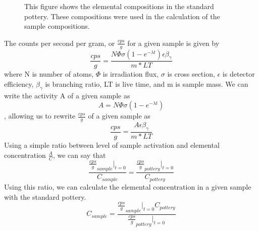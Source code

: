 \documentclass[]{article}
\begin{document}
\begin{figure}[h]
\centering
{}
\caption{This figure shows the elemental compositions in the standard pottery. These compositions were used in the calculation of the sample compositions.}
\end{figure}

The counts per second per gram, or $\frac{cps}{g}$ for a given sample is given by $$\frac{cps}{g} = \frac{N\Phi\sigma(1-e^{-\lambda t})\epsilon \beta_{ \gamma}}{m * LT}$$ where N is number of atoms, $\Phi$ is irradiation flux, $\sigma$ is cross section, $\epsilon$ is detector efficiency, $\beta_{\gamma}$ is branching ratio, LT is live time, and m is sample mass. We can write the activity A of a given sample as $$A=N\Phi\sigma(1-e^{-\lambda t})$$, allowing us to rewrite $\frac{cps}{g}$ of a given sample as $$\frac{cps}{g} = \frac{A\epsilon\beta_{\gamma}}{m*LT}$$ Using a simple ratio between level of sample activation and elemental concentration $\frac{A}{C}$, we can say that $$\frac{\frac{cps}{g}_{sample}|_{t=0}}{C_{sample}} = \frac{\frac{cps}{g}_{pottery}|_{t=0}}{C_{pottery}}$$ Using this ratio, we can calculate the elemental concentration in a given sample with the standard pottery. $$C_{sample} = \frac{\frac{cps}{g}_{sample}|_{t=0} C_{pottery}}{\frac{cps}{g}_{pottery}|_{t=0}}$$
\end{document}
